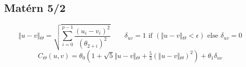 \subsection*{Mat\'{e}rn 5/2}
\[ \Vert{}u-v\Vert{}_\Theta{} = \sqrt{\sum_{i=0}^{p-1} \frac{(u_i - v_i)^2}{(\theta{}_{2+i})^2}} \qquad
 \delta{}_{uv} = 1 \text{ if } (\Vert{}u-v\Vert{}_\Theta{} < \epsilon{}) \textrm{ else } \delta{}_{uv} = 0 \]
\[ C_\Theta{}(u, v) = {\theta{}_0} \left({ 1 + \sqrt{5} \Vert{}u-v\Vert{}_\Theta{}
 + \tfrac{5}{3} \left({\Vert{}u-v\Vert{}_\Theta{}}\right)^2  }\right) + \theta{}_1\delta{}_{uv} \]

